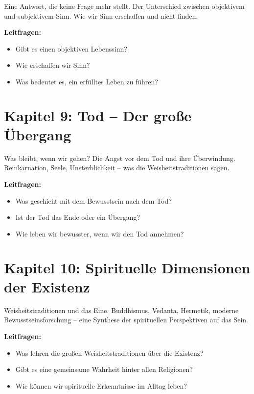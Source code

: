 Eine Antwort, die keine Frage mehr stellt. Der Unterschied zwischen objektivem und subjektivem Sinn. Wie wir Sinn erschaffen und nicht finden.

\textbf{Leitfragen:}
\begin{itemize}
	\item Gibt es einen objektiven Lebenssinn?
	\item Wie erschaffen wir Sinn?
	\item Was bedeutet es, ein erfülltes Leben zu führen?
\end{itemize}

\section*{Kapitel 9: Tod – Der große Übergang}

Was bleibt, wenn wir gehen? Die Angst vor dem Tod und ihre Überwindung. Reinkarnation, Seele, Unsterblichkeit – was die Weisheitstraditionen sagen.

\textbf{Leitfragen:}
\begin{itemize}
	\item Was geschieht mit dem Bewusstsein nach dem Tod?
	\item Ist der Tod das Ende oder ein Übergang?
	\item Wie leben wir bewusster, wenn wir den Tod annehmen?
\end{itemize}

\section*{Kapitel 10: Spirituelle Dimensionen der Existenz}

Weisheitstraditionen und das Eine. Buddhismus, Vedanta, Hermetik, moderne Bewusstseinsforschung – eine Synthese der spirituellen Perspektiven auf das Sein.

\textbf{Leitfragen:}
\begin{itemize}
	\item Was lehren die großen Weisheitstraditionen über die Existenz?
	\item Gibt es eine gemeinsame Wahrheit hinter allen Religionen?
	\item Wie können wir spirituelle Erkenntnisse im Alltag leben?
\end{itemize}

